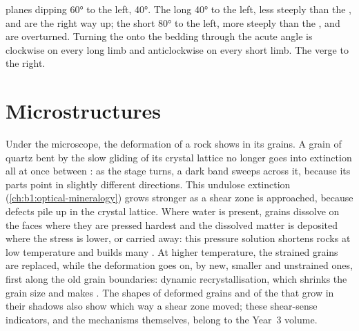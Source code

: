 \begin{omfigure}
{{planes} dipping \ang{60} to the left,  \ang{40}. The long 
 \ang{40} to the left, less steeply than the , and are the right
way up; the short   \ang{80} to the left, more steeply than the
, and are overturned. Turning the  onto the bedding through
the acute angle is clockwise on every long limb and anticlockwise on every
short limb. The  verge to the right.}
\label{fig:b1:faults-folds-fabrics:vergence}
\end{omfigure}

\section{Microstructures}\label{sec:b1:faults-folds-fabrics:micro}

Under the microscope, the deformation of a rock shows in its grains. A grain
of quartz bent by the slow gliding of its crystal lattice no longer goes into
extinction all at once between : as the stage turns, a dark band
sweeps across it, because its parts point in slightly different directions.
This undulose extinction (\cref{ch:b1:optical-mineralogy}) grows stronger as
a shear zone is approached, because defects pile up in the crystal lattice.
Where water is present, grains dissolve on the faces where they are pressed
hardest and the dissolved matter is deposited where the stress is lower, or
carried away: this pressure solution shortens rocks at low temperature and
builds many . At higher temperature, the strained grains are
replaced, while the deformation goes on, by new, smaller and unstrained ones,
first along the old grain boundaries: dynamic recrystallisation, which shrinks
the grain size and makes . The shapes of deformed grains and of the  that grow in
their shadows also show which way a shear zone moved; these shear-sense
indicators, and the mechanisms themselves, belong to the Year~3 volume.

